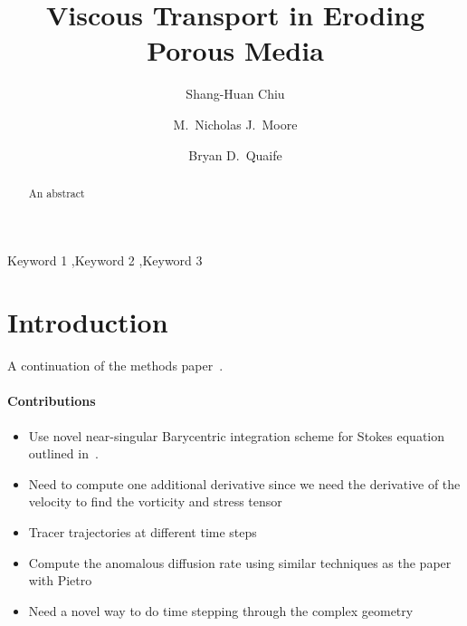 \documentclass[preprint, 10pt]{elsarticle}
\begin{document}
\title{Viscous Transport in Eroding Porous Media}



\author[SH]{Shang-Huan Chiu}
\author[Nick]{M.~Nicholas J.~Moore}
\author[Bryan]{Bryan D.~Quaife}

\address[SH]{Department of Scientific Computing, Florida State
University, Tallahassee, FL, 32306.}
\address[Nick]{Department of Mathematics and Geophysical Fluid Dynamics Institute, Florida State University, Tallahassee, FL, 32306.}
\address[Bryan]{Department of Scientific Computing and Geophysical Fluid Dynamics Institute, Florida State University, Tallahassee, FL, 32306.}

\begin{abstract} 
  An abstract
\end{abstract}

\begin{keyword}
  Keyword 1 \sep Keyword 2 \sep Keyword 3 
\end{keyword}

\maketitle

\section{Introduction\label{s:intro}}
A continuation of the methods paper~\cite{qua-moo2018}.


\paragraph{Contributions}
\begin{itemize}
  \item Use novel near-singular Barycentric integration scheme for
    Stokes equation outlined in~\cite{bar-wu-vee2015}.
  \item Need to compute one additional derivative since we need the
    derivative of the velocity to find the vorticity and stress tensor
  \item Tracer trajectories at different time steps
  \item Compute the anomalous diffusion rate using similar techniques as
    the paper with Pietro~\cite{dea-qua-bir-jua2018}
  \item Need a novel way to do time stepping through the complex
    geometry
\end{itemize}
\end{document}
